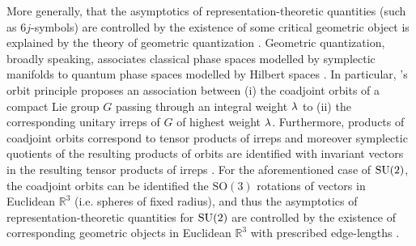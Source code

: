 \documentclass[notitlepage, 10pt]{article}
\begin{document}
More generally, that the asymptotics of representation-theoretic quantities (such as $6j$-symbols) are controlled by the existence of some critical geometric object is explained by the theory of geometric quantization \cite{roberts2002asymptotics}. 
Geometric quantization, broadly speaking, associates classical phase spaces modelled by symplectic manifolds to quantum phase spaces modelled by Hilbert spaces \cite{roberts2002asymptotics,guillemin1982geometric,kirillov2004lectures}.
In particular, \citeauthor{kirillov2004lectures}'s orbit principle \cite{kirillov2004lectures} proposes an association between (i) the coadjoint orbits of a compact Lie group $G$ passing through an integral weight $\lambda$ to (ii) the corresponding unitary irreps of $G$ of highest weight $\lambda$.
Furthermore, products of coadjoint orbits correspond to tensor products of irreps and moreover symplectic quotients of the resulting products of orbits are identified with invariant vectors in the resulting tensor products of irreps \cite{roberts2002asymptotics, guillemin1982geometric}.
For the aforementioned case of $\operatorname{SU}(2)$, the coadjoint orbits can be identified the $\mathrm{SO}(3)$ rotations of vectors in Euclidean $\mathbb R^3$ (i.e. spheres of fixed radius), and thus the asymptotics of representation-theoretic quantities for $\operatorname{SU}(2)$ are controlled by the existence of corresponding geometric objects in Euclidean $\mathbb R^3$ with prescribed edge-lengths \cite{roberts2002asymptotics}.
\end{document}
